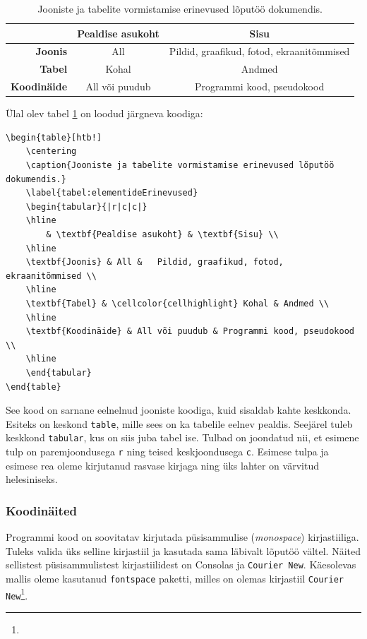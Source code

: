 \begin{table}[htb!]
    \centering
    \caption{Jooniste ja tabelite vormistamise erinevused lõputöö dokumendis.}
    \label{tabel:elementideErinevused}
    \begin{tabular}{|r|c|c|}
    \hline
    & \textbf{Pealdise asukoht} & \textbf{Sisu} \\
    \hline
    \textbf{Joonis} & All &   Pildid, graafikud, fotod, ekraanitõmmised \\
    \hline
    \textbf{Tabel} & \cellcolor{cellhighlight} Kohal & Andmed \\
    \hline
    \textbf{Koodinäide} & All või puudub & Programmi kood, pseudokood \\
    \hline
    \end{tabular}
\end{table}

Ülal olev tabel \ref{tabel:elementideErinevused} on loodud järgneva koodiga:
\begin{verbatim}
\begin{table}[htb!]
    \centering
    \caption{Jooniste ja tabelite vormistamise erinevused lõputöö dokumendis.}
    \label{tabel:elementideErinevused}
    \begin{tabular}{|r|c|c|}
    \hline
        & \textbf{Pealdise asukoht} & \textbf{Sisu} \\
    \hline
    \textbf{Joonis} & All &   Pildid, graafikud, fotod, ekraanitõmmised \\
    \hline
    \textbf{Tabel} & \cellcolor{cellhighlight} Kohal & Andmed \\
    \hline
    \textbf{Koodinäide} & All või puudub & Programmi kood, pseudokood \\
    \hline
    \end{tabular}
\end{table}
\end{verbatim}

See kood on sarnane eelnelnud jooniste koodiga, kuid sisaldab kahte keskkonda. Esiteks on keskond \verb|table|, mille sees on ka tabelile eelnev pealdis. Seejärel tuleb keskkond \verb|tabular|, kus on siis juba tabel ise. Tulbad on joondatud nii, et esimene tulp on paremjoondusega \verb|r| ning teised keskjoondusega \verb|c|. Esimese tulpa ja esimese rea oleme kirjutanud rasvase kirjaga ning üks lahter on värvitud helesiniseks.

\subsubsection{Koodinäited}
Programmi kood on soovitatav kirjutada püsisammulise (\emph{monospace}) kirjastiiliga. Tuleks valida üks selline kirjastiil ja kasutada sama läbivalt lõputöö vältel. Näited sellistest püsisammulistest kirjastiilidest on Consolas ja \texttt{Courier New}. Käesolevas mallis oleme kasutanud \verb|fontspace| paketti, milles on olemas kirjastiil \texttt{Courier New}\footnote{}.

